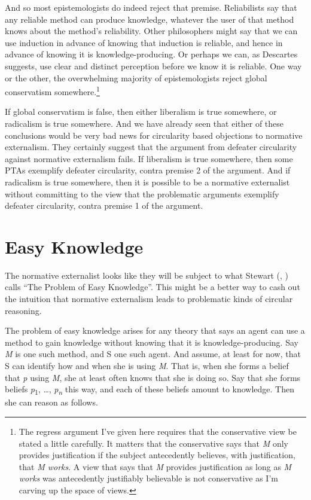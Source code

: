 \documentclass[
  10pt,
  letterpaper,
  twoside]{scrbook}
\begin{document}
And so most epistemologists do indeed reject that premise. Reliabilists
say that any reliable method can produce knowledge, whatever the user of
that method knows about the method's reliability. Other philosophers
might say that we can use induction in advance of knowing that induction
is reliable, and hence in advance of knowing it is knowledge-producing.
Or perhaps we can, as Descartes suggests, use clear and distinct
perception before we know it is reliable. One way or the other, the
overwhelming majority of epistemologists reject global conservatism
somewhere.\footnote{The regress argument I've given here requires that
  the conservative view be stated a little carefully. It matters that
  the conservative says that \emph{M} only provides justification if the
  subject antecedently believes, with justification, that \emph{M
  works}. A view that says that \emph{M} provides justification as long
  as \emph{M works} was antecedently justifiably believable is not
  conservative as I'm carving up the space of views.}

If global conservatism is false, then either liberalism is true
somewhere, or radicalism is true somewhere. And we have already seen
that either of these conclusions would be very bad news for circularity
based objections to normative externalism. They certainly suggest that
the argument from defeater circularity against normative externalism
fails. If liberalism is true somewhere, then some PTAs exemplify
defeater circularity, contra premise 2 of the argument. And if
radicalism is true somewhere, then it is possible to be a normative
externalist without committing to the view that the problematic
arguments exemplify defeater circularity, contra premise 1 of the
argument.

\section{Easy Knowledge}\label{easyknowledge}

The normative externalist looks like they will be subject to what
Stewart (,
) calls ``The Problem of Easy Knowledge''.
This might be a better way to cash out the intuition that normative
externalism leads to problematic kinds of circular reasoning.

The problem of easy knowledge arises for any theory that says an agent
can use a method to gain knowledge without knowing that it is
knowledge-producing. Say \emph{M} is one such method, and S one such
agent. And assume, at least for now, that S can identify how and when
she is using \emph{M}. That is, when she forms a belief that \emph{p}
using \emph{M}, she at least often knows that she is doing so. Say that
she forms beliefs \emph{p}\textsubscript{1}, \ldots,
\emph{p\textsubscript{n}} this way, and each of these beliefs amount to
knowledge. Then she can reason as follows.
\end{document}
